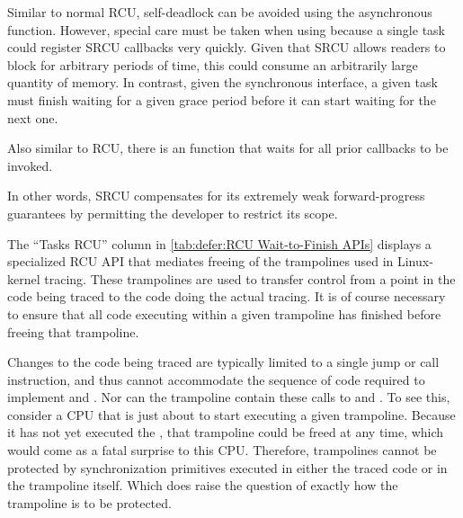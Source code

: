 \QuickQuizEnd

Similar to normal RCU, self-deadlock can be avoided using the
asynchronous  function.
However, special care must be taken when using  because
a single task could register SRCU callbacks very quickly.
Given that SRCU allows readers to block for arbitrary periods of
time, this could consume an arbitrarily large quantity of memory.
In contrast, given the synchronous 
interface, a given task must finish waiting for a given grace period
before it can start waiting for the next one.

Also similar to RCU, there is an  function that waits
for all prior  callbacks to be invoked.

In other words, SRCU compensates for its extremely weak
forward-progress guarantees by permitting the developer to restrict
its scope.

The ``Tasks RCU'' column in
\cref{tab:defer:RCU Wait-to-Finish APIs} displays a specialized
RCU API that mediates freeing of the trampolines used in Linux-kernel
tracing.
These trampolines are used to transfer control from a point in the
code being traced to the code doing the actual tracing.
It is of course necessary to ensure that all code executing within
a given trampoline has finished before freeing that trampoline.

Changes to the code being traced are typically limited to a single jump
or call instruction, and thus cannot accommodate the sequence of code
required to implement  and .
Nor can the trampoline contain these calls to  and
.
To see this, consider a CPU that is just about to start executing a
given trampoline.
Because it has not yet executed the , that
trampoline could be freed at any time, which would come as a fatal
surprise to this CPU\@.
Therefore, trampolines cannot be protected by synchronization primitives
executed in either the traced code or in the trampoline itself.
Which does raise the question of exactly how the trampoline is to be
protected.

